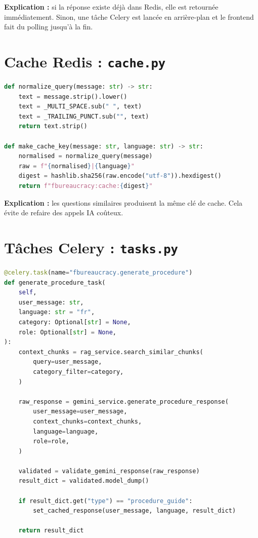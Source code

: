 \documentclass[12pt,a4paper]{report}
\begin{document}
\textbf{Explication :} si la réponse existe déjà dans Redis, elle est retournée immédiatement. Sinon, une tâche Celery est lancée en arrière-plan et le frontend fait du polling jusqu'à la fin.

\section{Cache Redis : \texttt{cache.py}}

\begin{lstlisting}[language=Python,caption={Clé de cache Redis}]
def normalize_query(message: str) -> str:
    text = message.strip().lower()
    text = _MULTI_SPACE.sub(" ", text)
    text = _TRAILING_PUNCT.sub("", text)
    return text.strip()

def make_cache_key(message: str, language: str) -> str:
    normalised = normalize_query(message)
    raw = f"{normalised}|{language}"
    digest = hashlib.sha256(raw.encode("utf-8")).hexdigest()
    return f"fbureaucracy:cache:{digest}"
\end{lstlisting}

\textbf{Explication :} les questions similaires produisent la même clé de cache. Cela évite de refaire des appels IA coûteux.

\section{Tâches Celery : \texttt{tasks.py}}

\begin{lstlisting}[language=Python,caption={Tâche de génération de procédure}]
@celery.task(name="fbureaucracy.generate_procedure")
def generate_procedure_task(
    self,
    user_message: str,
    language: str = "fr",
    category: Optional[str] = None,
    role: Optional[str] = None,
):
    context_chunks = rag_service.search_similar_chunks(
        query=user_message,
        category_filter=category,
    )

    raw_response = gemini_service.generate_procedure_response(
        user_message=user_message,
        context_chunks=context_chunks,
        language=language,
        role=role,
    )

    validated = validate_gemini_response(raw_response)
    result_dict = validated.model_dump()

    if result_dict.get("type") == "procedure_guide":
        set_cached_response(user_message, language, result_dict)

    return result_dict
\end{lstlisting}
\end{document}
